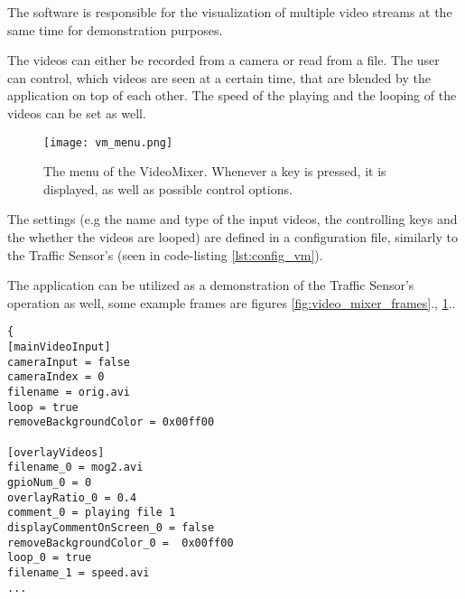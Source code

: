 The software is responsible for the visualization of multiple video streams at the same time for demonstration purposes.

The videos can either be recorded from a camera or read from a file.
The user can control, which videos are seen at a certain time, that are blended by the application on top of each other.
The speed of the playing and the looping of the videos can be set as well.

\begin{figure}[!h]
	\centering
	\texttt{[image: vm\_menu.png]}
	
	\caption[Menu of the VideoMixer]{The menu of the VideoMixer. Whenever a key is pressed, it is displayed, as well as possible control options. \label{fig:video_mixer_menu}}
\end{figure}

The settings (e.g the name and type of the input videos, the controlling keys and the whether the videos are looped) are defined in a configuration file, similarly to the Traffic Sensor's (seen in code-listing \ref{lst:config_vm}).

The application can be utilized as a demonstration of the Traffic Sensor's operation as well, some example frames are figures \ref{fig:video_mixer_frames}., \ref{fig:video_mixer_menu}..

\begin{lstlisting}[frame=single,float=!ht,caption={ Part of a configuration file for the VideoMixer application. The file sets parameters for the main input video {(section [mainVideoInput])}, and the overlay videos {(section [overlayVideos])}, that are blended on top. The file defines whether the video is read from a camera or a file, whether specific parts of the background are removed or not, and other adjustments, like the comment that is displayed on the screen, whenever a video starts playing.},label=lst:config_vm]
{
[mainVideoInput]
cameraInput = false
cameraIndex = 0
filename = orig.avi
loop = true
removeBackgroundColor = 0x00ff00

[overlayVideos]
filename_0 = mog2.avi
gpioNum_0 = 0
overlayRatio_0 = 0.4
comment_0 = playing file 1
displayCommentOnScreen_0 = false
removeBackgroundColor_0 =  0x00ff00
loop_0 = true
filename_1 = speed.avi
...
\end{lstlisting}

